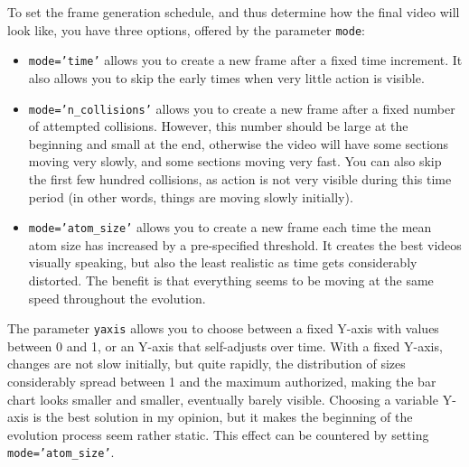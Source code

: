 \documentclass[oneside,10pt]{book}
\begin{document}
To set the frame generation schedule, and thus determine how the final video will look like, you have three options, offered
 by the parameter \texttt{mode}:\vspace{1ex}
\begin{itemize}
\item \texttt{mode='time'} allows you to create a new frame after a fixed time increment. It also allows you to skip the early times when very little action is visible.
\item \texttt{mode='n\_collisions'} allows you to create a new frame after a fixed number of attempted collisions. However, this
  number should be large at the beginning and small at the end, otherwise the video will have some sections moving very slowly, and some sections moving very fast. You can also skip the first few hundred collisions, as action is not very visible during this time period (in other words, things are moving slowly initially).
\item \texttt{mode='atom\_size'} allows you to create a new frame each time the mean atom size has increased by a pre-specified threshold.
 It creates the best videos visually speaking, but also the least realistic as time gets considerably distorted. The benefit is that
 everything seems to be moving at the same speed throughout the evolution.
\end{itemize}\vspace{1ex}
  

\noindent The parameter \texttt{yaxis} allows you to choose between a fixed Y-axis with values between 0 and 1, or an Y-axis that self-adjusts over time. With a fixed Y-axis, changes are not slow initially, but quite rapidly, the distribution of sizes considerably spread
 between 1 and the maximum authorized, making the bar chart looks smaller and smaller, eventually barely visible.  Choosing a variable Y-axis is the best solution in my opinion, but it makes the beginning of the evolution process seem rather static. This effect can be countered
 by setting \texttt{mode='atom\_size'}.  \vspace{1ex}
\end{document}
